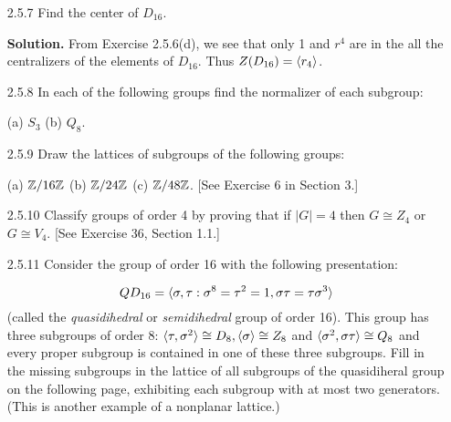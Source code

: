 \begin{enumerate}
   \item[2.5.7]   Find the center of $D_{16}$.
   
      \textbf{Solution.} From Exercise 2.5.6(d), we see that only 1 and $r^4$
      are in the all the centralizers of the elements of $D_{16}$. Thus
      $Z(D_{16}) = \langle r_4 \rangle$.
   \item[2.5.8]   In each of the following groups find the normalizer of each
                  subgroup:

                  (a) $S_3$ \qquad (b) $Q_8$.
   \item[2.5.9]   Draw the lattices of subgroups of the following groups:

                  (a) $\mathbb{Z}/16\mathbb{Z}$ \qquad (b) $\mathbb{Z}/24\mathbb{Z}$ \qquad
                  (c) $\mathbb{Z}/48\mathbb{Z}$. [See Exercise 6 in Section 3.]
   \item[2.5.10]  Classify groups of order 4 by proving that if $|G| = 4$ then
                  $G \cong Z_4$ or $G\cong V_4$. [See Exercise 36, Section 1.1.]
   \item[2.5.11]  Consider the group of order 16 with the following
                  presentation:

                  $$QD_{16} = \langle \sigma, \tau : \sigma^8 = \tau^2 = 1,
                    \sigma\tau = \tau\sigma^3 \rangle$$
                  (called the \textit{quasidihedral} or \textit{semidihedral}
                  group of order 16). This group has three subgroups of order 8:
                  $\langle \tau, \sigma^2 \rangle \cong D_8, \langle \sigma \rangle \cong Z_8$ and
                  $\langle \sigma^2, \sigma\tau \rangle \cong Q_8$ and every proper
                  subgroup is contained in one of these three subgroups. Fill in
                  the missing subgroups in the lattice of all subgroups of the 
                  quasidiheral group on the following page, exhibiting each
                  subgroup with at most two generators. (This is another example
                  of a nonplanar lattice.)
\end{enumerate}

